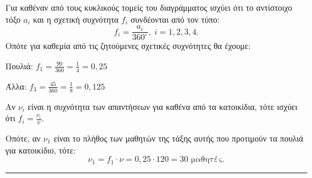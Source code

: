 
\begin{alist}
    \item Για καθέναν από τους κυκλικούς τομείς του διαγράμματος ισχύει ότι το αντίστοιχο τόξο $a_i$ και η σχετική συχνότητα $f_i$ συνδέονται από τον τύπο:
    \[ f_i = \frac{a_i}{360^{\circ}} , \; i = 1,2,3,4. \]
    Οπότε για καθεμία από τις ζητούμενες σχετικές συχνότητες θα έχουμε:
    \par Πουλιά: $f_1 = \frac{90}{360} = \frac{1}{4} = 0,25$
    \par Άλλα: $f_3 = \frac{45}{360} = \frac{1}{8} = 0,125$
    
    \item Αν $\nu_i$ είναι η συχνότητα των απαντήσεων για καθένα από τα κατοικίδια, τότε ισχύει ότι $f_i = \frac{\nu_i}{\nu}$.
    \par Οπότε, αν $\nu_1$ είναι το πλήθος των μαθητών της τάξης αυτής που προτιμούν τα πουλιά για κατοικίδιο, τότε:
    \[ \nu_1 = f_1 \cdot \nu = 0,25 \cdot 120 = 30 \text{ μαθητές.} \]
\end{alist}
\vspace{6mm}
\noindent\rule{\textwidth}{0.4pt}
\vspace{6mm}

